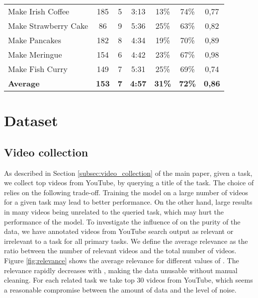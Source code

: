 \documentclass[10pt,twocolumn,letterpaper]{article}
\begin{document}
\begin{table*}[t]
{\begin{tabular}{@{}lcccccc@{}}
Make Irish Coffee     & 185              & 5               & 3:13           & 13\%          & 74\%          & 0,77              \\
Make Strawberry Cake  & 86               & 9               & 5:36           & 25\%          & 63\%          & 0,82              \\
Make Pancakes         & 182              & 8               & 4:34           & 19\%          & 70\%          & 0,89              \\
Make Meringue         & 154              & 6               & 4:42           & 23\%          & 67\%          & 0,98              \\
Make Fish Curry       & 149              & 7               & 5:31           & 25\%          & 69\%          & 0,74              \\ \midrule
\textbf{Average}      & \textbf{153}     & \textbf{7}      & \textbf{4:57}  & \textbf{31\%} & \textbf{72\%} & \textbf{0,86}     \\ \bottomrule
\end{tabular}
}
\end{table*}

\section{Dataset}
\label{sec:dataset}
\subsection{Video collection}
As described in Section \ref{subsec:video_collection} of the main paper, given a task, we collect top  videos from YouTube, by querying a title of the task.
The choice of  relies on the following trade-off.
Training the model on a large number of videos for a given task may lead to better performance.
On the other hand, large  results in many videos being unrelated to the queried task, which may hurt the performance of the model.
To investigate the influence of  on the purity of the data, we have annotated videos from YouTube search output as relevant or irrelevant to a task for all primary tasks.
We define the average relevance as the ratio between the number of relevant videos and the total number of videos.
Figure \ref{fig:relevance} shows the average relevance for different values of .
The relevance rapidly decreases with , making the data unusable without manual cleaning.
For each related task we take top 30 videos from YouTube, which seems a reasonable compromise between the amount of data and the level of noise.
\end{document}
